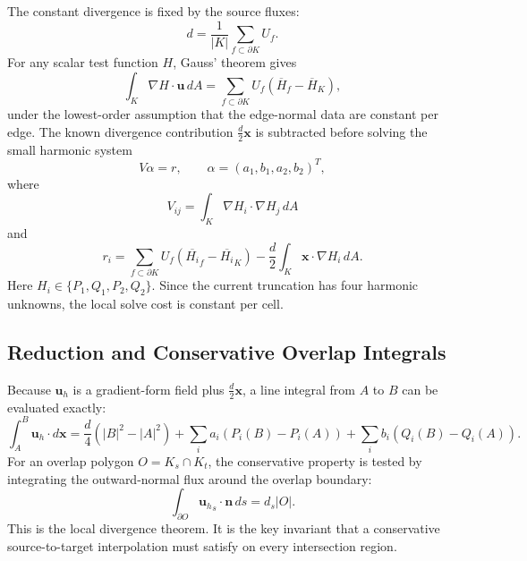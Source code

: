 \documentclass[11pt]{article}
\newcommand{\uh}{\mathbf{u}_h}
\newcommand{\x}{\mathbf{x}}
\newcommand{\n}{\mathbf{n}}
\begin{document}
The constant divergence is fixed by the source fluxes:
\begin{equation}
  d = \frac{1}{|K|}\sum_{f\subset\partial K} U_f.
  \label{eq:divergence}
\end{equation}
For any scalar test function \(H\), Gauss' theorem gives
\begin{equation}
  \int_K \nabla H\cdot \mathbf{u}\,dA
  =
  \sum_{f\subset\partial K} U_f
  \left(\overline{H}_f-\overline{H}_K\right),
  \label{eq:moment}
\end{equation}
under the lowest-order assumption that the edge-normal data are constant per
edge.  The known divergence contribution \(\frac{d}{2}\x\) is subtracted before
solving the small harmonic system
\begin{equation}
  V\alpha = r,\qquad
  \alpha = (a_1,b_1,a_2,b_2)^T,
  \label{eq:local_system}
\end{equation}
where
\begin{equation}
  V_{ij} = \int_K \nabla H_i\cdot\nabla H_j\,dA
  \label{eq:gram}
\end{equation}
and
\begin{equation}
  r_i =
    \sum_{f\subset\partial K} U_f
      \left(\overline{H_i}_f-\overline{H_i}_K\right)
    - \frac{d}{2}\int_K \x\cdot\nabla H_i\,dA.
  \label{eq:rhs}
\end{equation}
Here \(H_i\in\{P_1,Q_1,P_2,Q_2\}\).  Since the current truncation has four
harmonic unknowns, the local solve cost is constant per cell.

\subsection{Reduction and Conservative Overlap Integrals}

Because \(\uh\) is a gradient-form field plus \(\frac{d}{2}\x\), a line
integral from \(A\) to \(B\) can be evaluated exactly:
\begin{equation}
  \int_A^B \uh\cdot d\x
  =
  \frac{d}{4}\left(|B|^2-|A|^2\right)
  + \sum_i a_i\left(P_i(B)-P_i(A)\right)
  + \sum_i b_i\left(Q_i(B)-Q_i(A)\right).
  \label{eq:line_integral}
\end{equation}
For an overlap polygon \(O=K_s\cap K_t\), the conservative property is tested by
integrating the outward-normal flux around the overlap boundary:
\begin{equation}
  \int_{\partial O} {\uh}_s\cdot\n\,ds = d_s |O|.
  \label{eq:overlap_conservation}
\end{equation}
This is the local divergence theorem.  It is the key invariant that a
conservative source-to-target interpolation must satisfy on every intersection
region.
\end{document}
